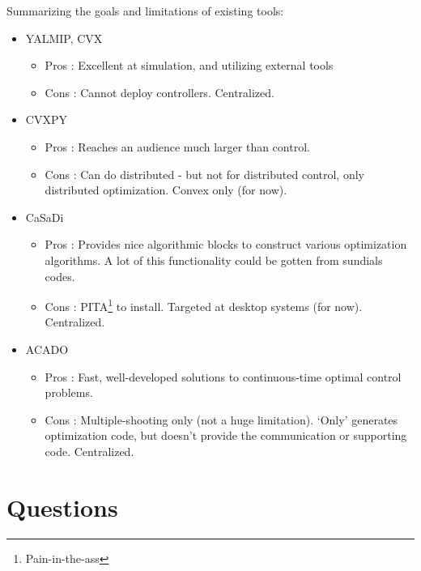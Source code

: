 \documentclass[11pt,a4paper]{article}
\begin{document}
Summarizing the goals and limitations of existing tools:
\begin{itemize}
  \item YALMIP, CVX
  \begin{itemize}
    \item Pros : Excellent at simulation, and utilizing external tools
    \item Cons : Cannot deploy controllers. Centralized.
  \end{itemize}
  \item CVXPY
  \begin{itemize}
    \item Pros : Reaches an audience much larger than control.
    \item Cons : Can do distributed - but not for distributed control, only distributed optimization. Convex only (for now).
  \end{itemize}
  \item CaSaDi
  \begin{itemize}
    \item Pros : Provides nice algorithmic blocks to construct various optimization algorithms. A lot of this functionality could be gotten from sundials codes.
    \item Cons : PITA\footnote{Pain-in-the-ass} to install. Targeted at desktop systems (for now). Centralized.
  \end{itemize}
  \item ACADO
  \begin{itemize}
    \item Pros : Fast, well-developed solutions to continuous-time optimal control problems.
    \item Cons : Multiple-shooting only (not a huge limitation). `Only' generates optimization code, but doesn't provide the communication or supporting code. Centralized.
  \end{itemize}
\end{itemize}

\section*{Questions}
\end{document}
